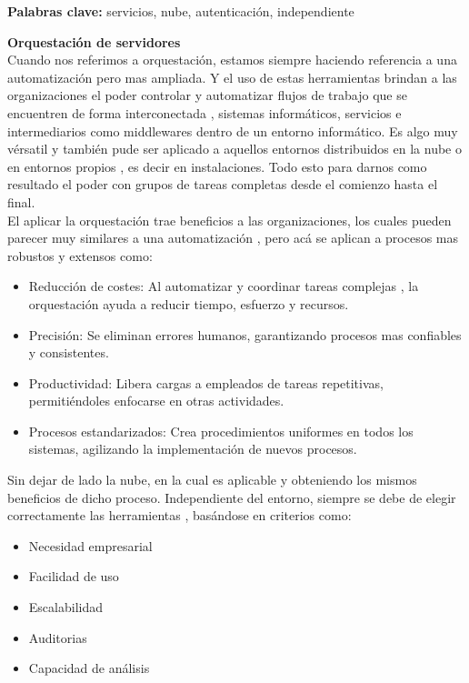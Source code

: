 \documentclass[12pt]{article}
\begin{document}
\noindent\textbf{Palabras clave: } servicios, nube, autenticación, independiente

\vspace{1em}
\noindent\textbf{Orquestación de servidores} \\
Cuando nos referimos a orquestación, estamos siempre haciendo referencia a una automatización pero mas ampliada. Y el uso de estas herramientas brindan a las organizaciones el poder controlar y automatizar flujos de trabajo que se encuentren de forma interconectada , sistemas informáticos, servicios e intermediarios como middlewares dentro de un entorno informático. Es algo muy vérsatil y también pude ser aplicado a aquellos entornos distribuidos en la nube o en entornos propios , es decir en instalaciones. Todo esto para darnos como resultado el poder con grupos de tareas completas desde el comienzo hasta el final.
\\
El aplicar la orquestación trae beneficios a las organizaciones, los cuales pueden parecer muy similares a una automatización , pero acá se aplican a procesos mas robustos y extensos como:
\begin{itemize}
    \item Reducción de costes: Al automatizar y coordinar tareas complejas , la orquestación ayuda a reducir tiempo, esfuerzo y recursos. 
    \item Precisión: Se eliminan errores humanos, garantizando procesos mas confiables y consistentes.
    \item Productividad: Libera cargas a empleados de tareas repetitivas, permitiéndoles enfocarse en otras actividades.
        \item Procesos estandarizados: Crea procedimientos uniformes en todos los sistemas, agilizando la implementación de nuevos procesos.
\end{itemize}
Sin dejar de lado la nube, en la cual es aplicable y obteniendo los mismos beneficios de dicho proceso. Independiente del entorno, siempre se debe de elegir correctamente las herramientas , basándose en criterios como:
\begin{itemize}
    \item Necesidad empresarial
    \item Facilidad de uso
    \item Escalabilidad
    \item Auditorias
    \item Capacidad de análisis
\end{itemize}
\end{document}
